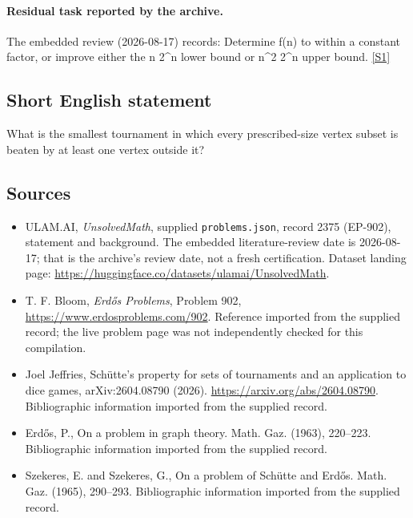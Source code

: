 \documentclass[11pt,a4paper]{article}
\newcommand{\sref}[2]{\hyperlink{source:#1:#2}{[S#2]}}
\begin{document}
\paragraph{Residual task reported by the archive.}

The embedded review (2026-08-17) records: Determine f(n) to within a constant factor, or improve either the n 2\textasciicircum{}n lower bound or n\textasciicircum{}2 2\textasciicircum{}n upper bound. \sref{2375}{1}

\subsection{Short English statement}

What is the smallest tournament in which every prescribed-size vertex subset is beaten by at least one vertex outside it?

\subsection{Sources}

{\small

\begin{itemize}

\item[\hypertarget{source:2375:1}{S1}] ULAM.AI, \emph{UnsolvedMath}, supplied \texttt{problems.json}, record 2375 (EP-902), statement and background. The embedded literature-review date is 2026-08-17; that is the archive’s review date, not a fresh certification. Dataset landing page: \url{https://huggingface.co/datasets/ulamai/UnsolvedMath}.

\item[\hypertarget{source:2375:2}{S2}] T. F. Bloom, \emph{Erdős Problems}, Problem 902, \url{https://www.erdosproblems.com/902}. Reference imported from the supplied record; the live problem page was not independently checked for this compilation.

\item[\hypertarget{source:2375:3}{S3}] Joel Jeffries, Schütte's property for sets of tournaments and an application to dice games, arXiv:2604.08790 (2026). \url{https://arxiv.org/abs/2604.08790}. Bibliographic information imported from the supplied record.

\item[\hypertarget{source:2375:4}{S4}] Erd\H{o}s, P., On a problem in graph theory. Math. Gaz. (1963), 220--223. Bibliographic information imported from the supplied record.

\item[\hypertarget{source:2375:5}{S5}] Szekeres, E. and Szekeres, G., On a problem of {S}ch\"{u}tte and {E}rd\H{o}s. Math. Gaz. (1965), 290--293. Bibliographic information imported from the supplied record.

\end{itemize}

}

\label{end:2375}
\end{document}

